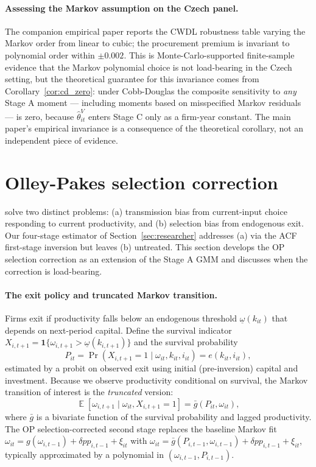 \documentclass[11pt]{article}
\DeclareMathOperator{\E}{\mathbb{E}}
\begin{document}
\paragraph{Assessing the Markov assumption on the Czech panel.} The companion empirical paper reports the CWDL robustness table varying the Markov order from linear to cubic; the procurement premium is invariant to polynomial order within $\pm 0.002$. This is Monte-Carlo-supported finite-sample evidence that the Markov polynomial choice is not load-bearing in the Czech setting, but the theoretical guarantee for this invariance comes from Corollary~\ref{cor:cd_zero}: under Cobb-Douglas the composite sensitivity to \emph{any} Stage A moment --- including moments based on misspecified Markov residuals --- is zero, because $\hat\theta^V_{it}$ enters Stage C only as a firm-year constant. The main paper's empirical invariance is a consequence of the theoretical corollary, not an independent piece of evidence.

\section{Olley-Pakes selection correction}\label{sec:op_selection}

\citet{OP1996} solve two distinct problems: (a) transmission bias from current-input choice responding to current productivity, and (b) selection bias from endogenous exit. Our four-stage estimator of Section~\ref{sec:researcher} addresses (a) via the ACF first-stage inversion but leaves (b) untreated. This section develops the OP selection correction as an extension of the Stage A GMM and discusses when the correction is load-bearing.

\paragraph{The exit policy and truncated Markov transition.} Firms exit if productivity falls below an endogenous threshold $\underline\omega(k_{it})$ that depends on next-period capital. Define the survival indicator $X_{i,t+1} = \mathbf{1}\{\omega_{i,t+1} > \underline\omega(k_{i,t+1})\}$ and the survival probability
\begin{equation}\label{eq:survival}
P_{it} = \Pr(X_{i,t+1} = 1 \mid \omega_{it}, k_{it}, i_{it}) = e(k_{it}, i_{it}),
\end{equation}
estimated by a probit on observed exit using initial (pre-inversion) capital and investment. Because we observe productivity conditional on survival, the Markov transition of interest is the \emph{truncated} version:
\begin{equation}\label{eq:truncated_markov}
\E[\omega_{i,t+1} \mid \omega_{it}, X_{i,t+1}=1] = \bar g(P_{it}, \omega_{it}),
\end{equation}
where $\bar g$ is a bivariate function of the survival probability and lagged productivity. The OP selection-corrected second stage replaces the baseline Markov fit $\omega_{it} = g(\omega_{i,t-1}) + \delta pp_{i,t-1} + \xi_{it}$ with $\omega_{it} = \bar g(P_{i,t-1}, \omega_{i,t-1}) + \delta pp_{i,t-1} + \xi_{it}$, typically approximated by a polynomial in $(\omega_{i,t-1}, P_{i,t-1})$.
\end{document}
